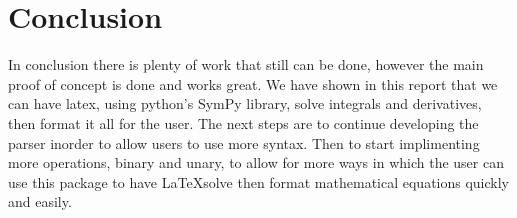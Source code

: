 \documentclass[english]{article}
\begin{document}



\section{Conclusion}
In conclusion there is plenty of work that still can be done, however the main proof of concept is done and works great. We have shown in this report that we can have latex, using python's SymPy library, solve integrals and derivatives, then format it all for the user. The next steps are to continue developing the parser inorder to allow users to use more syntax. Then to start implimenting more operations, binary and unary, to allow for more ways in which the user can use this package to have \LaTeX solve then format mathematical equations quickly and easily.
\end{document}
